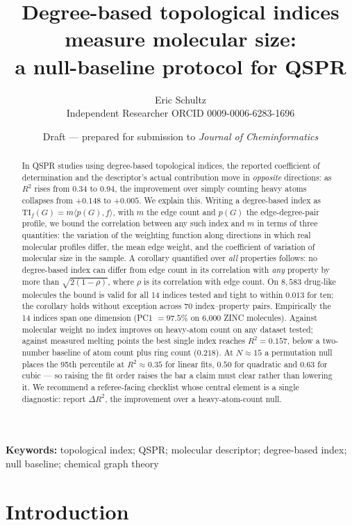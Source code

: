 \documentclass[11pt,a4paper]{article}
\title{\bfseries Degree-based topological indices measure molecular size:\\
a null-baseline protocol for QSPR}
\author{Eric Schultz\\[2pt]
\small Independent Researcher \quad ORCID 0009-0006-6283-1696}
\date{Draft --- prepared for submission to \emph{Journal of Cheminformatics}}
\theoremstyle{plain}
\newcommand{\TI}{\mathrm{TI}}
\begin{document}
\maketitle

\begin{abstract}
\noindent
In QSPR studies using degree-based topological indices, the reported coefficient of
determination and the descriptor's actual contribution move in \emph{opposite}
directions: as $R^2$ rises from $0.34$ to $0.94$, the improvement over simply counting
heavy atoms collapses from $+0.148$ to $+0.005$. We explain this. Writing a degree-based
index as $\TI_f(G)=m\langle p(G),f\rangle$, with $m$ the edge count and $p(G)$ the
edge-degree-pair profile, we bound the correlation between any such index and $m$ in
terms of three quantities: the variation of the weighting function along directions in
which real molecular profiles differ, the mean edge weight, and the coefficient of
variation of molecular size in the sample. A corollary quantified over \emph{all}
properties follows: no degree-based index can differ from edge count in its correlation
with \emph{any} property by more than $\sqrt{2(1-\rho)}$, where $\rho$ is its correlation
with edge count. On $8{,}583$ drug-like molecules the bound is valid for all 14 indices
tested and tight to within $0.013$ for ten; the corollary holds without exception across
70 index--property pairs. Empirically the 14 indices span one dimension
(PC1 $=97.5\%$ on 6{,}000 ZINC molecules). Against molecular weight no index improves on
heavy-atom count on any dataset tested; against measured melting points the best single
index reaches $R^2=0.157$, below a two-number baseline of atom count plus ring count
($0.218$). At $N\approx15$ a permutation null places the 95th percentile at $R^2\approx0.35$
for linear fits, $0.50$ for quadratic and $0.63$ for cubic --- so raising the fit order
raises the bar a claim must clear rather than lowering it. We recommend a referee-facing
checklist whose central element is a single diagnostic: report $\Delta R^2$, the
improvement over a heavy-atom-count null.
\end{abstract}

\noindent\textbf{Keywords:} topological index; QSPR; molecular descriptor; degree-based
index; null baseline; chemical graph theory

\section{Introduction}
\end{document}
